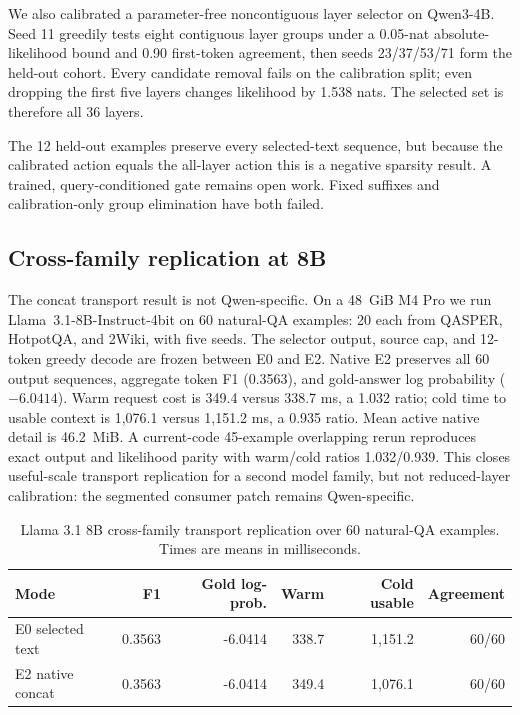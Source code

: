 \documentclass[10pt]{article}
\begin{document}
We also calibrated a parameter-free noncontiguous layer selector on Qwen3-4B.
Seed 11 greedily tests eight contiguous layer groups under a 0.05-nat
absolute-likelihood bound and 0.90 first-token agreement, then seeds
23/37/53/71 form the held-out cohort. Every candidate removal fails on the
calibration split; even dropping the first five layers changes likelihood by
1.538 nats. The selected set is therefore all 36 layers.

\begin{table}[H]
\centering
\scriptsize
\caption{Held-out noncontiguous consumer-layer calibration. The calibrated
gate is learned from the calibration split but resolves to all layers.}

\label{tab:mlx-learned-layer-gate}
\end{table}

The 12 held-out examples preserve every selected-text sequence, but because
the calibrated action equals the all-layer action this is a negative sparsity
result. A trained, query-conditioned gate remains open work. Fixed suffixes
and calibration-only group elimination have both failed.

\subsection{Cross-family replication at 8B}

The concat transport result is not Qwen-specific. On a 48~GiB M4 Pro we run
Llama~3.1-8B-Instruct-4bit on 60 natural-QA examples: 20 each from QASPER,
HotpotQA, and 2Wiki, with five seeds. The selector output, source cap, and
12-token greedy decode are frozen between E0 and E2. Native E2 preserves all
60 output sequences, aggregate token F1 (0.3563), and gold-answer log
probability ($-6.0414$). Warm request cost is 349.4 versus 338.7 ms, a 1.032
ratio; cold time to usable context is 1,076.1 versus 1,151.2 ms, a 0.935 ratio.
Mean active native detail is 46.2~MiB. A current-code 45-example overlapping
rerun reproduces exact output and likelihood parity with warm/cold ratios
1.032/0.939. This closes useful-scale transport replication for a second model
family, but not reduced-layer calibration: the segmented consumer patch remains
Qwen-specific.

\begin{table}[H]
\centering
\small
\caption{Llama 3.1 8B cross-family transport replication over 60 natural-QA
examples. Times are means in milliseconds.}
\begin{tabular}{lrrrrr}
\toprule
Mode & F1 & Gold log-prob. & Warm & Cold usable & Agreement \\
\midrule
E0 selected text & 0.3563 & -6.0414 & 338.7 & 1,151.2 & 60/60 \\
E2 native concat & 0.3563 & -6.0414 & 349.4 & 1,076.1 & 60/60 \\
\bottomrule
\end{tabular}
\label{tab:mlx-llama8b-cross-family}
\end{table}
\end{document}
